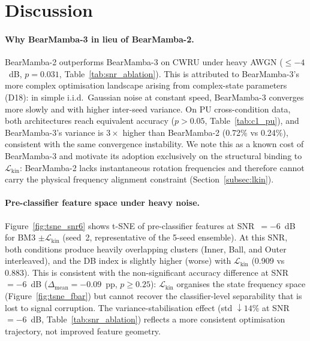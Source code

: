 
\section{Discussion}
\label{sec:discussion}

\paragraph{Why BearMamba-3 in lieu of BearMamba-2.}
BearMamba-2 outperforms BearMamba-3 on CWRU under heavy AWGN
($\leq -4$~dB, $p = 0.031$, Table~\ref{tab:snr_ablation}).
This is attributed to BearMamba-3's more complex optimisation landscape
arising from complex-state parameters (D18): in simple i.i.d.\ Gaussian
noise at constant speed, BearMamba-3 converges more slowly and with higher
inter-seed variance.
On PU cross-condition data, both architectures reach equivalent accuracy
($p > 0.05$, Table~\ref{tab:c1_pu}), and BearMamba-3's variance is
$3\times$ higher than BearMamba-2 (0.72\% vs 0.24\%), consistent with
the same convergence instability.
We note this as a known cost of BearMamba-3 and motivate its adoption
exclusively on the structural binding to $\mathcal{L}_{\text{kin}}$:
BearMamba-2 lacks instantaneous rotation frequencies and therefore cannot
carry the physical frequency alignment constraint (Section~\ref{subsec:lkin}).

\paragraph{Pre-classifier feature space under heavy noise.}
Figure~\ref{fig:tsne_snr6} shows t-SNE of pre-classifier features at SNR~$=-6$~dB
for BM3 $\pm\mathcal{L}_{\text{kin}}$ (seed~2, representative of the 5-seed ensemble).
At this SNR, both conditions produce heavily overlapping clusters
(Inner, Ball, and Outer interleaved), and the DB index is slightly higher
(worse) with $\mathcal{L}_{\text{kin}}$ (0.909 vs 0.883).
This is consistent with the non-significant accuracy difference at SNR~$=-6$~dB
($\Delta_{\text{mean}} = -0.09$~pp, $p \geq 0.25$): $\mathcal{L}_{\text{kin}}$
organises the state frequency space (Figure~\ref{fig:tsne_fbar}) but cannot
recover the classifier-level separability that is lost to signal corruption.
The variance-stabilisation effect (std $\downarrow 14\%$ at SNR~$=-6$~dB,
Table~\ref{tab:snr_ablation}) reflects a more consistent optimisation trajectory,
not improved feature geometry.

